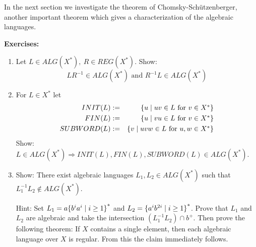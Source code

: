 In the next section we investigate the theorem of Chomsky-Schützenberger,
another important theorem which gives a characterization of the algebraic languages.

{\bf Exercises:}

\begin{enumerate}
  \item Let $L\in ALG(X^*),\ R\in REG(X^*)$. Show:
  \[ LR^{-1}\in ALG(X^*)\text{ and }R^{-1}L\in ALG(X^*) \]
  
  \item For $L\in X^*$ let
  \begin{eqnarray*}
  INIT(L) &:=& \mbox{$\{u\mid uv\in L\text{ for }v\in X^*\}$}\\
  FIN(L) &:=& \mbox{$\{u\mid vu\in L\text{ for }v\in X^*\}$}\\
  SUBWORD(L) &:=& \mbox{$\{v\mid uvw\in L\text{ for }u,w\in X^*\}$}
  \end{eqnarray*}
  Show: $L\in ALG(X^*) \Rightarrow INIT(L), FIN(L), SUBWORD(L)\in ALG(X^*)$.
  
  \item Show: There exist algebraic languages $L_1, L_2\in ALG(X^*)$ such that
  $L_1^{-1} L_2 \notin ALG(X^*)$.
  
  Hint: Set $L_1 = a \mbox{$\{b^ia^i\mid i\geq 1\}$}^*$ and $L_2 =
  \mbox{$\{a^{i}b^{2i}\mid i\geq 1\}$}^*$. Prove that $L_1$ and $L_2$ are algebraic
  and take the intersection $(L_1^{-1}L_2)\cap b^+$. Then prove the following
  theorem: If $X$ contains a single element, then each algebraic language over
  $X$ is regular. From this the claim immediately follows.
\end{enumerate}
